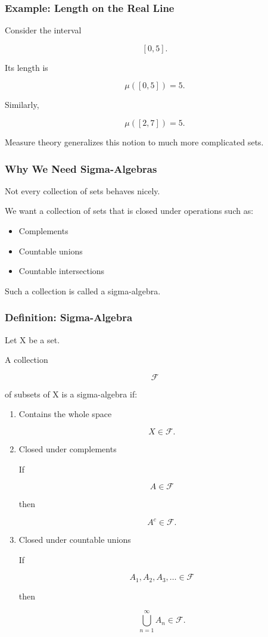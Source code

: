 \documentclass[11pt]{article}
\begin{document}
\subsubsection{Example: Length on the Real Line}
\label{sec:orged313b9}

Consider the interval

\[
[0,5].
\]

Its length is

\[
\mu([0,5]) = 5.
\]

Similarly,

\[
\mu([2,7]) = 5.
\]

Measure theory generalizes this notion to much more complicated sets.
\subsubsection{Why We Need Sigma-Algebras}
\label{sec:org2adc731}

Not every collection of sets behaves nicely.

We want a collection of sets that is closed under operations such as:

\begin{itemize}
\item Complements
\item Countable unions
\item Countable intersections
\end{itemize}

Such a collection is called a sigma-algebra.
\subsubsection{Definition: Sigma-Algebra}
\label{sec:org48d4519}

Let X be a set.

A collection

\[
\mathcal F
\]

of subsets of X is a sigma-algebra if:
\begin{enumerate}
\item Contains the whole space
\label{sec:org0235403}

\[
X \in \mathcal F.
\]
\item Closed under complements
\label{sec:orgf4ca345}

If

\[
A \in \mathcal F
\]

then

\[
A^c \in \mathcal F.
\]
\item Closed under countable unions
\label{sec:org154c357}

If

\[
A_1,A_2,A_3,\ldots \in \mathcal F
\]

then

\[
\bigcup_{n=1}^{\infty} A_n
\in \mathcal F.
\]
\end{enumerate}
\end{document}
